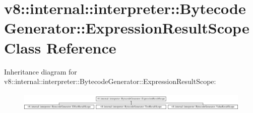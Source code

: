 \hypertarget{classv8_1_1internal_1_1interpreter_1_1BytecodeGenerator_1_1ExpressionResultScope}{}\section{v8\+:\+:internal\+:\+:interpreter\+:\+:Bytecode\+Generator\+:\+:Expression\+Result\+Scope Class Reference}
\label{classv8_1_1internal_1_1interpreter_1_1BytecodeGenerator_1_1ExpressionResultScope}
Inheritance diagram for v8\+:\+:internal\+:\+:interpreter\+:\+:Bytecode\+Generator\+:\+:Expression\+Result\+Scope\+:\begin{figure}[H]
\begin{center}
\leavevmode
\includegraphics[height=0.931006cm]{classv8_1_1internal_1_1interpreter_1_1BytecodeGenerator_1_1ExpressionResultScope}
\end{center}
\end{figure}
